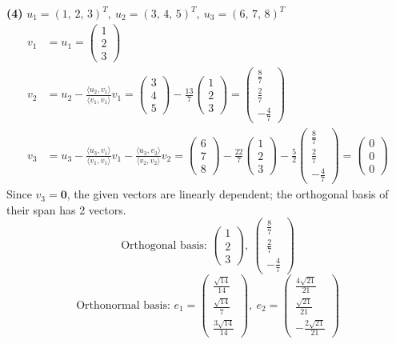 \noindent\textbf{(4)} $u_1=(1,\,2,\,3)^T,\ u_2=(3,\,4,\,5)^T,\ u_3=(6,\,7,\,8)^T$
\begin{align*}
v_1&=u_1=\begin{pmatrix}1 \\ 2 \\ 3\end{pmatrix} \\
v_2&=u_2-\frac{\langle u_2,v_1\rangle}{\langle v_1,v_1\rangle}v_1=\begin{pmatrix}3 \\ 4 \\ 5\end{pmatrix}-\frac{13}{7}\begin{pmatrix}1 \\ 2 \\ 3\end{pmatrix}=\begin{pmatrix}\frac{8}{7} \\ \frac{2}{7} \\ - \frac{4}{7}\end{pmatrix} \\
v_3&=u_3-\frac{\langle u_3,v_1\rangle}{\langle v_1,v_1\rangle}v_1-\frac{\langle u_3,v_2\rangle}{\langle v_2,v_2\rangle}v_2=\begin{pmatrix}6 \\ 7 \\ 8\end{pmatrix}-\frac{22}{7}\begin{pmatrix}1 \\ 2 \\ 3\end{pmatrix} -\frac{5}{2}\begin{pmatrix}\frac{8}{7} \\ \frac{2}{7} \\ - \frac{4}{7}\end{pmatrix}=\begin{pmatrix}0 \\ 0 \\ 0\end{pmatrix}
\end{align*}
Since $v_3=\mathbf0$, the given vectors are linearly dependent; the orthogonal basis of their span has 2 vectors.
\[ \text{Orthogonal basis: }\begin{pmatrix}1 \\ 2 \\ 3\end{pmatrix},\ \begin{pmatrix}\frac{8}{7} \\ \frac{2}{7} \\ - \frac{4}{7}\end{pmatrix} \]
\[ \text{Orthonormal basis: }e_1=\begin{pmatrix}\frac{\sqrt{14}}{14} \\ \frac{\sqrt{14}}{7} \\ \frac{3 \sqrt{14}}{14}\end{pmatrix},\ e_2=\begin{pmatrix}\frac{4 \sqrt{21}}{21} \\ \frac{\sqrt{21}}{21} \\ - \frac{2 \sqrt{21}}{21}\end{pmatrix} \]

